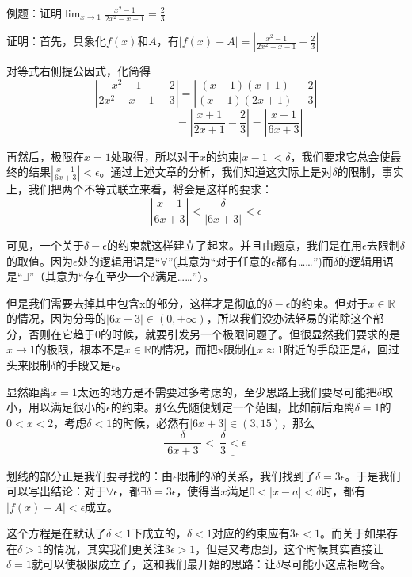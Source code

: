 \documentclass[fontset=none]{ctexart}
\begin{document}
    \lishu 例题：证明$\lim_{x\rightarrow 1}\frac{x^2-1}{2x^2-x-1}=\frac{2}{3}$


    \(\)证明：首先，具象化$f(x)$和$A$，有$\left| f\left( x \right) -A \right|=\left| \frac{x^2-1}{2x^2-x-1}-\frac{2}{3} \right|$
    
    \(\)对等式右侧提公因式，化简得
    $$
    \left| \frac{x^2-1}{2x^2-x-1}-\frac{2}{3} \right|=\left| \frac{\left( x-1 \right) \left( x+1 \right)}{\left( x-1 \right) \left( 2x+1 \right)}-\frac{2}{3} \right|
    $$
    $$
    \ \ \ \ \ \ \ \ \ \ \ \ \ \ \ \ \ \ \ \ \ \ \ \ \ \ \ =\left| \frac{x+1}{2x+1}-\frac{2}{3} \right|=\left| \frac{x-1}{6x+3} \right|
    $$

    再然后，极限在$x=1$处取得，所以对于$x$的约束$|x-1|<\delta$，我们要求它总会使最终的结果$\left| \frac{x-1}{6x+3} \right|<\epsilon$。通过上述文章的分析，我们知道这实际上是对$\delta$的限制，事实上，我们把两个不等式联立来看，将会是这样的要求：
    $$\left| \frac{x-1}{6x+3} \right|<\frac{\delta}{\left| 6x+3 \right|}<\epsilon$$
    
    可见，一个关于$\delta-\epsilon$的约束就这样建立了起来。并且由题意，我们是在用$\epsilon$去限制$\delta$的取值。因为$\epsilon$处的逻辑用语是“$\forall$”(其意为“对于任意的$\epsilon$都有……”)而$\delta$的逻辑用语是“$\exists$”（其意为“存在至少一个$\delta$满足……”）。

    但是我们需要去掉其中包含x的部分，这样才是彻底的$\delta-\epsilon$的约束。但对于$x\in \mathbb{R}$的情况，因为分母的$\left| 6x+3 \right|\in \left( 0,+\infty \right)$，所以我们没办法轻易的消除这个部分，否则在它趋于0的时候，就要引发另一个极限问题了。但很显然我们要求的是$x\to 1$的极限，根本不是$x\in \mathbb{R}$的情况，而把x限制在$x\approx 1$附近的手段正是$\delta$，回过头来限制$\delta$的手段又是$\epsilon$。
    
    显然距离$x=1$太远的地方是不需要过多考虑的，至少思路上我们要尽可能把$\delta$取小，用以满足很小的$\epsilon$的约束。那么先随便划定一个范围，比如前后距离$\delta=1$的\ $0<x<2$，考虑$\delta<1$的时候，必然有$\left| 6x+3 \right|\in \left( 3,15 \right)$，那么$$\frac{\delta}{\left| 6x+3 \right|}<\underline{\ \frac{\delta}{3} <\epsilon\ }$$

    划线的部分正是我们要寻找的：由$\epsilon$限制的$\delta$的关系，我们找到了$\delta=3\epsilon$。于是我们可以写出结论：对于$\forall\epsilon$，都$\exists\delta=3\epsilon $，使得当$x$满足$0<\left| x-a \right|<\delta$时，都有$\left| f(x)-A \right|<\epsilon$成立。
    
    这个方程是在默认了$\delta<1$下成立的，$\delta<1$对应的约束应有$3\epsilon<1$。而关于如果存在$\delta>1$的情况，其实我们更关注$3\epsilon>1$，但是又考虑到，这个时候其实直接让$\delta=1$就可以使极限成立了，这和我们最开始的思路：让$\delta$尽可能小这点相吻合。\songti 
\end{document}
